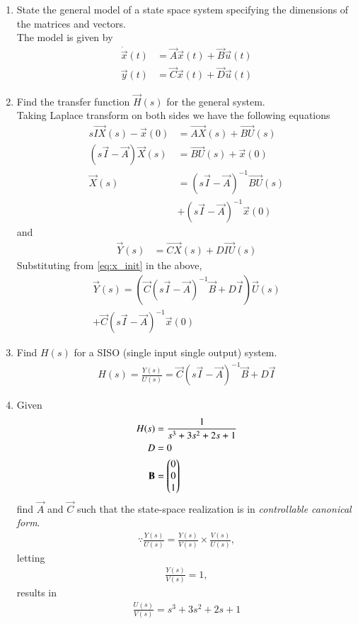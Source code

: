 \begin{enumerate}[label=\thesection.\arabic*.,ref=\thesection.\theenumi]
\item State the general model of a state space system specifying the dimensions of the matrices and vectors.
\\
\solution The model is given by 
\begin{align}
\dot{\vec{x}}(t)&=\vec{A}\vec{x}(t)+\vec{B}\vec{u}(t) \\
 \vec{y}(t)&=\vec{C}\vec{x}(t)+\vec{D} \vec{u}(t)
\end{align}

\item Find the transfer function $\vec{H}(s)$ for the general system.
\\
\solution 
Taking Laplace transform on both sides we have the following equations
\begin{align}
 s\vec{IX}(s)-\vec{x}(0)&= \vec{AX}(s)+ \vec{BU}(s)\\
(s\vec{I}-\vec{A})\vec{X}(s)&= \vec{BU}(s)+ \vec{x}(0)\\
\vec{X}(s)&={(s\vec{I}-\vec{A})^{-1}}\vec{B U}(s)\\
& +(s\vec{I}-\vec{A})^{-1}\vec{x}(0)
\label{eq:x_init}
\end{align}
and
\begin{align}
\vec{Y}(s)&= \vec{CX}(s)+D\vec{IU}(s)
\end{align}
Substituting from \eqref{eq:x_init} in the above,
%
\begin{multline}
\vec{Y}(s)=( \vec{C}{(s\vec{I}-\vec{A})^{-1}}\vec{B}+D\vec{I}) \vec{U}(s) 
\\
+ \vec{C}(s\vec{I}-\vec{A})^{-1}\vec{x}(0)
\end{multline}
%
\item Find $H(s)$ for a SISO (single input single output) system.
\\
\solution
\begin{align}
H(s)= {\frac{Y(s)}{U(s)}}= \vec{C}{(s\vec{I}-\vec{A})^{-1}}\vec{B}+D\vec{I}
\end{align}

\item Given 
\begin{align}
H(s)&=\frac{1}{s^3+3s^2+2s+1}
\\
D&=0
\\
\mathbf{B}&= \begin{pmatrix}0\\0\\1\end{pmatrix}
\end{align}
%
 find $\vec{A}$ and $\vec{C}$ such that the state-space realization is in {\em controllable canonical form}.
\\
\solution 
\begin{align} 
\because {\frac{Y(s)}{U(s)}}= \frac{Y(s)}{V(s)} \times \frac{V(s)}{U(s)},
\end{align}
letting
\begin{align}
 {\frac{Y(s)}{V(s)}}= 1, 
\end{align}
results in 
\begin{align}
{\frac{U(s)}{V(s)}}={s^3 + 3s^2+2s + 1}
\end{align}


\end{enumerate}
